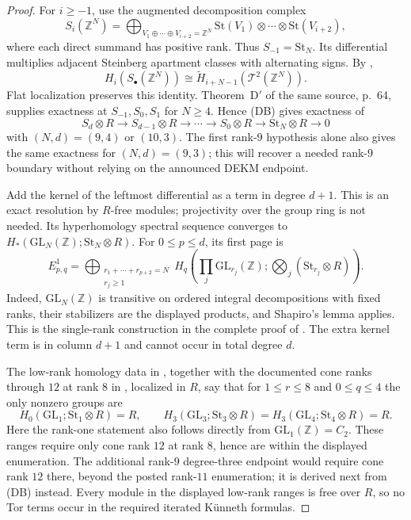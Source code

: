 \begin{proof}
For $i\ge-1$, use the augmented decomposition complex
\[
 S_i(\mathbb Z^N)=
 \bigoplus_{V_1\oplus\cdots\oplus V_{i+2}=\mathbb Z^N}
       \mathrm{St}(V_1)\otimes\cdots\otimes\mathrm{St}(V_{i+2}),
\]
where each direct summand has positive rank. Thus $S_{-1}=\mathrm{St}_N$.
Its differential multiplies adjacent Steinberg apartment classes with
alternating signs. By \cite[Theorem~23.3, p.~49]{MillerPatztPutman2025},
\[
 H_i(S_\bullet(\mathbb Z^N))
   \cong\widetilde H_{i+N-1}(\mathcal T^2(\mathbb Z^N)).
\]
Flat localization preserves this identity.
Theorem~D$'$ of the same source, p.~64, supplies exactness at
$S_{-1},S_0,S_1$ for $N\ge4$. Hence \textup{(DB)} gives exactness
of
\[
 S_d\otimes R\longrightarrow S_{d-1}\otimes R\longrightarrow\cdots
 \longrightarrow S_0\otimes R\longrightarrow\mathrm{St}_N\otimes R
 \longrightarrow0
\]
with $(N,d)=(9,4)$ or $(10,3)$.
The first rank-$9$ hypothesis alone also gives the same exactness
for $(N,d)=(9,3)$; this will recover a needed rank-$9$ boundary
without relying on the announced DEKM endpoint.

Add the kernel of the leftmost differential as a term in degree
$d+1$. This is an exact resolution by $R$-free modules; projectivity
over the group ring is not needed. Its hyperhomology spectral sequence
converges to $H_*(\mathrm{GL}_N(\mathbb Z);\mathrm{St}_N\otimes R)$.
For $0\le p\le d$, its first page is
\[
 E^1_{p,q}=
 \bigoplus_{\substack{r_1+\cdots+r_{p+2}=N\\r_j\ge1}}
 H_q\left(\prod_j\mathrm{GL}_{r_j}(\mathbb Z);
                   \bigotimes_j(\mathrm{St}_{r_j}\otimes R)\right).
                                                               \tag{DB1}
\]
Indeed, $\mathrm{GL}_N(\mathbb Z)$ is transitive on ordered integral
decompositions with fixed ranks, their stabilizers are the displayed
products, and Shapiro's lemma applies. This is the single-rank
construction in the complete proof of
\cite[Lemma~23.5, pp.~50--51]{MillerPatztPutman2025}.
The extra kernel term is in column $d+1$ and cannot occur in total
degree $d$.

The low-rank homology data in
\cite[Theorems~4.3 and~8.1]{ElbazGanglSoule2013}, together with
the documented cone ranks through $12$ at rank $8$ in
\cite[Proposition~1.5, Tables~3--5]{DEKM2026}, localized in $R$, say
that for $1\le r\le8$ and $0\le q\le4$ the only nonzero groups
are
\[
 H_0(\mathrm{GL}_1;\mathrm{St}_1\otimes R)=R,
 \qquad
 H_3(\mathrm{GL}_3;\mathrm{St}_3\otimes R)=
 H_3(\mathrm{GL}_4;\mathrm{St}_4\otimes R)=R.
\]
Here the rank-one statement also follows directly from
$\mathrm{GL}_1(\mathbb Z)=C_2$. These ranges require only cone
rank $12$ at rank $8$, hence are within the displayed enumeration.
The additional rank-$9$ degree-three endpoint would require cone
rank $12$ there, beyond the posted rank-$11$ enumeration; it is
derived next from \textup{(DB)} instead. Every module in the
displayed low-rank ranges is free over $R$, so no Tor terms occur
in the required iterated K\"unneth formulas.


\end{proof}
